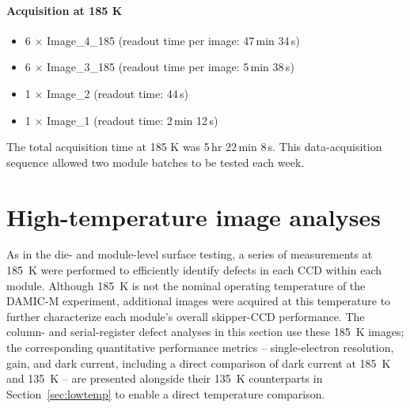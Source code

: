 \documentclass[11pt]{article}
\begin{document}
\paragraph{Acquisition at 185 K}

\begin{itemize}
    \item 6 $\times$ Image\_4\_185 \hfill (readout time per image: 47\,min 34\,s)
    \item 6 $\times$ Image\_3\_185 \hfill (readout time per image: 5\,min 38\,s)
    \item 1 $\times$ Image\_2 \hfill (readout time: 44\,s)
    \item 1 $\times$ Image\_1 \hfill (readout time: 2\,min 12\,s)
\end{itemize}

The total acquisition time at 185 K was 5\,hr 22\,min 8\,s. This data-acquisition sequence allowed two module batches to be tested each week.


\newpage
\section{High-temperature image analyses}
\label{sec:hightemp}

As in the die- and module-level surface testing, a series of measurements at 185~K were performed to efficiently identify defects in each CCD within each module. Although 185~K is not the nominal operating temperature of the DAMIC-M experiment, additional images were acquired at this temperature to further characterize each module's overall skipper-CCD performance. The column- and serial-register defect analyses in this section use these 185~K images; the corresponding quantitative performance metrics -- single-electron resolution, gain, and dark current, including a direct comparison of dark current at 185~K and 135~K -- are presented alongside their 135~K counterparts in Section~\ref{sec:lowtemp} to enable a direct temperature comparison.


\end{document}
